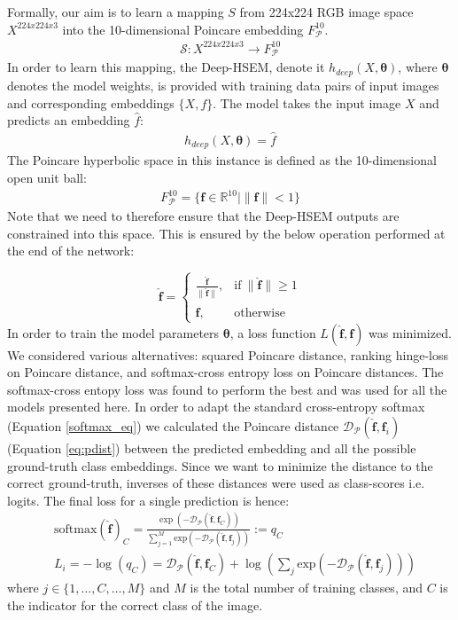 \documentclass[12pt]{report}
\begin{document}
Formally, our aim is to learn a mapping $S$ from 224x224 RGB image space $X^{224x224x3}$ into the 10-dimensional Poincare embedding $F_{\mathcal{P}}^{10}$.
\begin{align*}
\mathcal{S}: X^{224x224x3} \rightarrow F_{\mathcal{P}}^{10}
\end{align*}
In order to learn this mapping, the Deep-HSEM, denote it $h_{deep}(X, \pmb{\theta})$, where $\pmb{\theta}$ denotes the model weights, is provided with training data pairs of input images and corresponding embeddings $\{X, f\}$. The model takes the input image $X$ and predicts an embedding $\hat{f}$:
\begin{align*}
  h_{deep}(X, \pmb{\theta}) = \hat{f}
\end{align*}
The Poincare hyperbolic space in this instance is defined as the 10-dimensional open unit ball:
\begin{align*}
  F_{\mathcal{P}}^{10}=\{\mathbf{f} \in \mathbb{R}^{10} | \lVert \mathbf{f} \rVert <1 \}
\end{align*}
Note that we need to therefore ensure that the Deep-HSEM outputs are constrained into this space. This is ensured by the below operation performed at the end of the network:

\begin{equation}
\mathbf{\hat{f}} =
\begin{cases}
   \frac{\mathbf{\hat{f}}}{\lVert\mathbf{\hat{f}}\rVert}, & \text{if}\ \lVert\mathbf{\hat{f}}\rVert \geq 1 \\
   \mathbf{\hat{f}}, & \text{otherwise} 
\end{cases}
\end{equation}
In order to train the model parameters $\pmb{\theta}$, a loss function $L(\mathbf{\hat{f}}, \mathbf{f})$ was minimized. We considered various alternatives: squared Poincare distance, ranking hinge-loss on Poincare distance, and softmax-cross entropy loss on Poincare distances. The softmax-cross entopy loss was found to perform the best and was used for all the models presented here. In order to adapt the standard cross-entropy softmax (Equation \ref{softmax_eq}) we calculated the Poincare distance $\mathcal{D_{\mathcal{P}}}(\mathbf{\hat{f}}, \mathbf{f}_i)$ (Equation \ref{eq:pdist}) between the predicted embedding and all the possible ground-truth class embeddings. Since we want to minimize the distance to the correct ground-truth, inverses of these distances were used as class-scores i.e. logits. The final loss for a single prediction is hence:
\begin{align} \label{softmax_eq_poinc}
& \text{softmax}(\mathbf{\hat{f}})_C = \frac{\exp (-\mathcal{D_{\mathcal{P}}}(\mathbf{\hat{f}}, \mathbf{f}_C))}{\sum_{j=1}^M \text{exp}(-\mathcal{D_{\mathcal{P}}}(\mathbf{\hat{f}}, \mathbf{f}_j))} := q_C \\
& L_i  = -\log \left(q_C\right) = \mathcal{D_{\mathcal{P}}}(\mathbf{\hat{f}}, \mathbf{f}_C) + \log\left(\sum_j \text{exp}(-\mathcal{D_{\mathcal{P}}}(\mathbf{\hat{f}}, \mathbf{f}_j))\right)
\end{align}
where $j \in \{1,\dots,C,\dots,M\}$ and $M$ is the total number of training classes, and $C$ is the indicator for the correct class of the image. 
\end{document}
